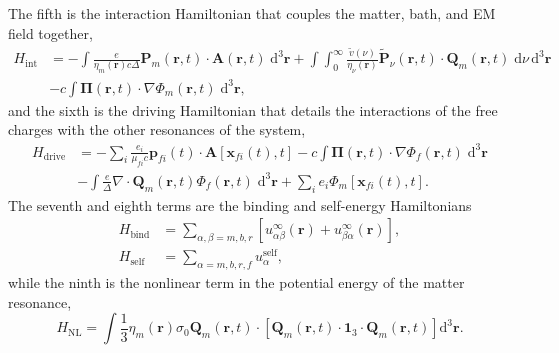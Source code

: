 \documentclass{article}
\begin{document}
The fifth is the interaction Hamiltonian that couples the matter, bath, and EM field together,
\begin{equation}
\begin{split}
H_\mathrm{int} &= -\int\frac{e}{\eta_m(\mathbf{r})c\Delta}\mathbf{P}_m(\mathbf{r},t)\cdot\mathbf{A}(\mathbf{r},t)\;\mathrm{d}^3\mathbf{r} + \int\int_0^\infty\frac{\tilde{v}(\nu)}{\eta_\nu(\mathbf{r})}\tilde{\mathbf{P}}_\nu(\mathbf{r},t)\cdot\mathbf{Q}_m(\mathbf{r},t)\;\mathrm{d}\nu\,\mathrm{d}^3\mathbf{r}\\
& - c\int\bm{\Pi}(\mathbf{r},t)\cdot\nabla\Phi_m(\mathbf{r},t)\;\mathrm{d}^3\mathbf{r},
\end{split}
\end{equation}
and the sixth is the driving Hamiltonian that details the interactions of the free charges with the other resonances of the system,
\begin{equation}
\begin{split}
H_\mathrm{drive} &= -\sum_i\frac{e_i}{\mu_{fi}c}\mathbf{p}_{fi}(t)\cdot\mathbf{A}[\mathbf{x}_{fi}(t),t] - c\int\bm{\Pi}(\mathbf{r},t)\cdot\nabla\Phi_f(\mathbf{r},t)\;\mathrm{d}^3\mathbf{r}\\&- \int\frac{e}{\Delta}\nabla\cdot\mathbf{Q}_m(\mathbf{r},t)\Phi_f(\mathbf{r},t)\;\mathrm{d}^3\mathbf{r} + \sum_ie_i\Phi_m[\mathbf{x}_{fi}(t),t].
\end{split}
\end{equation}
The seventh and eighth terms are the binding and self-energy Hamiltonians
\begin{equation}
\begin{split}
H_\mathrm{bind} &= \sum_{\alpha,\beta = m,b,r}\left[u_{\alpha\beta}^\infty(\mathbf{r}) + u_{\beta\alpha}^\infty(\mathbf{r})\right],\\
H_\mathrm{self} &= \sum_{\alpha = m,b,r,f}u_\alpha^\mathrm{self},
\end{split}
\end{equation}
while the ninth is the nonlinear term in the potential energy of the matter resonance,
\begin{equation}
H_\mathrm{NL} = \int\frac{1}{3}\eta_m(\mathbf{r})\sigma_0 \mathbf{Q}_m(\mathbf{r},t)\cdot\left[\mathbf{Q}_m(\mathbf{r},t)\cdot\bm{1}_3\cdot\mathbf{Q}_m(\mathbf{r},t)\right]\mathrm{d}^3\mathbf{r}.
\end{equation}
















\newpage





\end{document}
